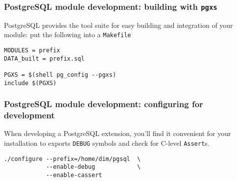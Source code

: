 \documentclass{beamer}
\begin{document}

\begin{frame}[fragile]
  \frametitle{PostgreSQL module development: building with \texttt{pgxs}}

  PostgreSQL provides the tool suite for easy building and integration of
  your module: put the following into a \texttt{Makefile}

  \begin{example}
  \begin{verbatim}
MODULES = prefix
DATA_built = prefix.sql

PGXS = $(shell pg_config --pgxs)
include $(PGXS)
  \end{verbatim}
  \end{example}
\end{frame}

\begin{frame}[fragile]
  \frametitle{PostgreSQL module development: configuring for development}

  When developing a PostgreSQL extension, you'll find it convenient for
  your installation to exports \texttt{DEBUG} symbols and check for C-level
  \texttt{Assert}s.

  \begin{example}
  \begin{verbatim}
./configure --prefix=/home/dim/pgsql  \
            --enable-debug            \
            --enable-cassert
  \end{verbatim}
  \end{example}
\end{frame}
\end{document}
